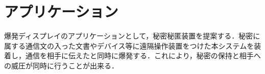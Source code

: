 \chapter{アプリケーション}
\label{chap:application}

爆発ディスプレイのアプリケーションとして，秘密秘匿装置を提案する．秘密に属する通信文の入った文書やデバイス等に遠隔操作装置をつけた本システムを装着し，通信を相手に伝えたと同時に爆発する．これにより，秘密の保持と相手への威圧が同時に行うことが出来る．
